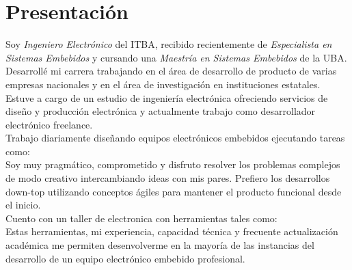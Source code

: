\section{Presentación}
Soy \emph{Ingeniero Electrónico} del ITBA, recibido recientemente de \emph{Especialista
en Sistemas Embebidos} y cursando una \emph{Maestría en Sistemas Embebidos} de la UBA. \\
Desarrollé mi carrera trabajando en el área de desarrollo de producto de varias
empresas nacionales y en el área de investigación en instituciones estatales.\\
Estuve a cargo de un estudio de ingeniería electrónica ofreciendo servicios de
diseño y producción electrónica y actualmente trabajo como desarrollador
electrónico freelance.\\ %
Trabajo diariamente diseñando equipos electrónicos embebidos ejecutando tareas como: \\
Soy muy pragmático, comprometido y disfruto resolver los problemas complejos de
modo creativo intercambiando ideas con mis pares. Prefiero los desarrollos
down-top utilizando conceptos ágiles para mantener el producto funcional desde
el inicio.\\
Cuento con un taller de electronica con herramientas tales como: \\
Estas herramientas, mi experiencia, capacidad técnica y frecuente actualización académica me
permiten desenvolverme en la mayoría de las instancias del desarrollo de un
equipo electrónico embebido profesional.\\
